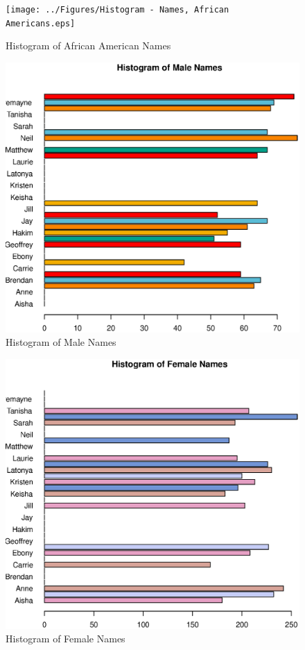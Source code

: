 \documentclass{paper}
\begin{document}
\begin{figure}
\centering
\texttt{[image: ../Figures/Histogram - Names, African Americans.eps]}
\caption{Histogram of African American Names}
\label{fig:blacknames}
\end{figure}


\begin{figure}
\centering
\includegraphics[width=\textwidth]{../Figures/Histogram - Names, Male.eps}
\caption{Histogram of Male Names}
\label{fig:malenames}
\end{figure}


\begin{figure}
\centering
\includegraphics[width=\textwidth]{../Figures/Histogram - Names, Female.eps}
\caption{Histogram of Female Names}
\label{fig:femalenames}
\end{figure}
\end{document}
